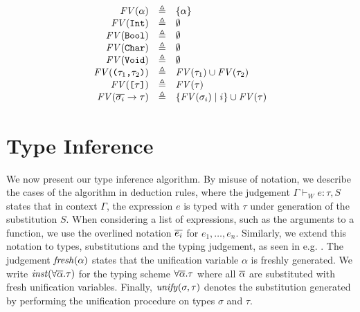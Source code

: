 \[
\begin{array}{rcl}
  \mathit{FV}(\alpha) & \triangleq & \{ \alpha \} \\
  \mathit{FV}(\texttt{Int}) & \triangleq & \emptyset \\
  \mathit{FV}(\texttt{Bool}) & \triangleq & \emptyset \\
  \mathit{FV}(\texttt{Char}) & \triangleq & \emptyset \\
  \mathit{FV}(\texttt{Void}) & \triangleq & \emptyset \\
  \mathit{FV}( \texttt{(}\tau_1\texttt{,}\tau_2\texttt{)} ) & \triangleq & \mathit{FV}(\tau_1) \cup \mathit{FV}(\tau_2) \\
  \mathit{FV}( \texttt{[}\tau\texttt{]} ) & \triangleq & \mathit{FV}(\tau) \\
  \mathit{FV}( \overline{\sigma_i} \to \tau ) & \triangleq & \{ \mathit{FV}(\sigma_i) \mid i \} \cup \mathit{FV}(\tau)
\end{array}
\]



\section{Type Inference}

We now present our type inference algorithm. By misuse of notation, we describe
the cases of the algorithm in deduction rules, where the judgement
$\Gamma \vdash_W e : \tau, S$ states that in context $\Gamma$, the expression $e$
is typed with $\tau$ under generation of the substitution $S$.
When considering a list of expressions, such as the arguments to a function, we
use the overlined notation $\overline{e_i}$ for $e_1,\dots,e_n$. Similarly, we
extend this notation to types, substitutions and the typing judgement, as seen
in e.g. .
The judgement $\mathit{fresh}(\alpha)$ states that the unification variable $\alpha$ is
freshly generated. We write $\mathit{inst}(\forall \overline{\alpha}. \tau)$ for the
typing scheme $\forall \overline{\alpha}. \tau$ where all $\overline{\alpha}$ are
substituted with fresh unification variables.
Finally, $\mathit{unify}(\sigma,\tau)$ denotes the substitution generated by performing
the unification procedure on types $\sigma$ and $\tau$.

